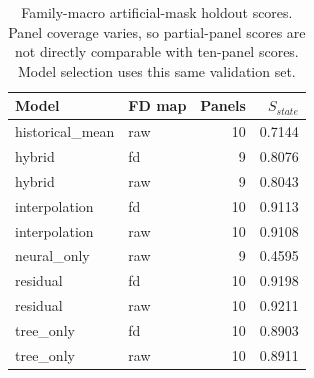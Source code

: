 \begin{table}[t]
\caption{Family-macro artificial-mask holdout scores. Panel coverage varies, so partial-panel scores are not directly comparable with ten-panel scores. Model selection uses this same validation set.}
\centering\begin{tabular}{llrr}
\hline Model & FD map & Panels & $S_{state}$ \\
\hline
historical\_mean & raw & 10 & 0.7144 \\
hybrid & fd & 9 & 0.8076 \\
hybrid & raw & 9 & 0.8043 \\
interpolation & fd & 10 & 0.9113 \\
interpolation & raw & 10 & 0.9108 \\
neural\_only & raw & 9 & 0.4595 \\
residual & fd & 10 & 0.9198 \\
residual & raw & 10 & 0.9211 \\
tree\_only & fd & 10 & 0.8903 \\
tree\_only & raw & 10 & 0.8911 \\
\hline\end{tabular}
\end{table}